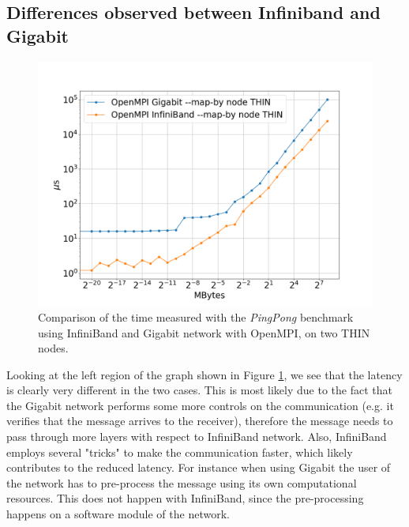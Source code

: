 \documentclass{article}
\begin{document}
\subsection{Differences observed between Infiniband and Gigabit}
\begin{figure}[t]
    \centering
    \includegraphics[width=\textwidth]{benchmark/infi_vs_giga_node.png}
    \caption{Comparison of the time measured with the \emph{PingPong} benchmark using InfiniBand and Gigabit network with OpenMPI, on two THIN nodes.}
    \label{fig:infi_vs_giga}
\end{figure}

Looking at the left region of the graph shown in Figure \ref{fig:infi_vs_giga}, we see that the latency is clearly very different in the two cases. This is most likely due to the fact that the Gigabit network performs some more controls on the communication (e.g. it verifies that the message arrives to the receiver), therefore the message needs to pass through more layers with respect to InfiniBand network. Also, InfiniBand employs several "tricks" to make the communication faster, which likely contributes to the reduced latency. For instance when using Gigabit the user of the network has to pre-process the message using its own computational resources. This does not happen with InfiniBand, since the pre-processing happens on a software module of the network.
\end{document}
